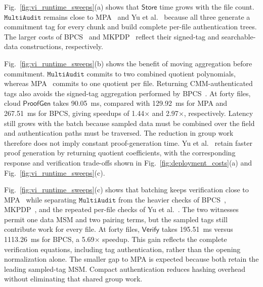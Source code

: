 \documentclass[lettersize,journal]{IEEEtran}
\newcommand{\Store}{\ensuremath{\mathsf{Store}}}
\newcommand{\ProofGen}{\ensuremath{\mathsf{ProofGen}}}
\newcommand{\Verify}{\ensuremath{\mathsf{Verify}}}
\newcommand{\MultiAudit}{\ensuremath{\mathtt{MultiAudit}}}
\begin{document}
Fig.~\ref{fig:vi_runtime_sweeps}(a) shows that \Store{} time grows with the file count. \MultiAudit{} remains close to MPA~\cite{XuTIFS26} and Yu et al.~\cite{YuTC25} because all three generate a commitment tag for every chunk and build complete per-file authentication trees. The larger costs of BPCS~\cite{ZhangTPDS23} and MKPDP~\cite{MiaoSCIS2026} reflect their signed-tag and searchable-data constructions, respectively.

Fig.~\ref{fig:vi_runtime_sweeps}(b) shows the benefit of moving aggregation before commitment. \MultiAudit{} commits to two combined quotient polynomials, whereas MPA~\cite{XuTIFS26} commits to one quotient per file. Returning CMM-authenticated tags also avoids the signed-tag aggregation performed by BPCS~\cite{ZhangTPDS23}. At forty files, cloud \ProofGen{} takes 90.05~ms, compared with 129.92~ms for MPA and 267.51~ms for BPCS, giving speedups of 1.44$\times$ and 2.97$\times$, respectively. Latency still grows with the batch because sampled data must be combined over the field and authentication paths must be traversed. The reduction in group work therefore does not imply constant proof-generation time. Yu et al.~\cite{YuTC25} retain faster proof generation by returning quotient coefficients, with the corresponding response and verification trade-offs shown in Fig.~\ref{fig:deployment_costs}(a) and Fig.~\ref{fig:vi_runtime_sweeps}(c).

Fig.~\ref{fig:vi_runtime_sweeps}(c) shows that batching keeps verification close to MPA~\cite{XuTIFS26} while separating \MultiAudit{} from the heavier checks of BPCS~\cite{ZhangTPDS23}, MKPDP~\cite{MiaoSCIS2026}, and the repeated per-file checks of Yu et al.~\cite{YuTC25}. The two witnesses permit one data MSM and two pairing terms, but the sampled tags still contribute work for every file. At forty files, \Verify{} takes 195.51~ms versus 1113.26~ms for BPCS, a 5.69$\times$ speedup. This gain reflects the complete verification equations, including tag authentication, rather than the opening normalization alone. The smaller gap to MPA is expected because both retain the leading sampled-tag MSM. Compact authentication reduces hashing overhead without eliminating that shared group work.
\end{document}
